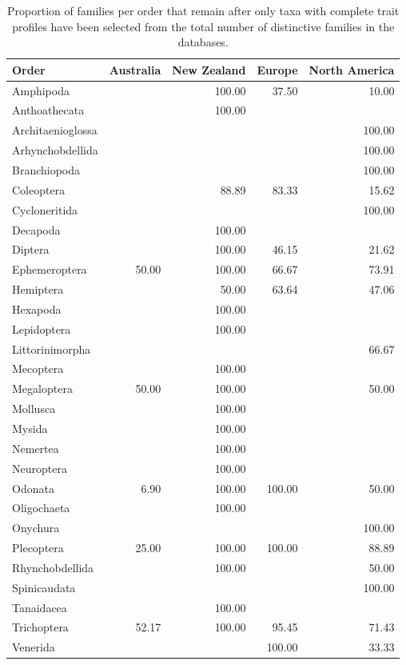 \documentclass{article}
\begin{document}
\begin{table}[H]
  \centering
  \caption{Proportion of families per order that remain
  after only taxa with complete trait profiles have been selected from the total
  number of distinctive families in the databases.} 
  \label{tab:fam_preproc/fam_init}
  \begin{tabular}{lrrrr}
    \hline
  Order & Australia & New Zealand & Europe & North America \\ 
    \hline
  Amphipoda &  & 100.00 & 37.50 & 10.00 \\ 
    Anthoathecata &  & 100.00 &  &  \\ 
    Architaenioglossa &  &  &  & 100.00 \\ 
    Arhynchobdellida &  &  &  & 100.00 \\ 
    Branchiopoda &  &  &  & 100.00 \\ 
    Coleoptera &  & 88.89 & 83.33 & 15.62 \\ 
    Cycloneritida &  &  &  & 100.00 \\ 
    Decapoda &  & 100.00 &  &  \\ 
    Diptera &  & 100.00 & 46.15 & 21.62 \\ 
    Ephemeroptera & 50.00 & 100.00 & 66.67 & 73.91 \\ 
    Hemiptera &  & 50.00 & 63.64 & 47.06 \\ 
    Hexapoda &  & 100.00 &  &  \\ 
    Lepidoptera &  & 100.00 &  &  \\ 
    Littorinimorpha &  &  &  & 66.67 \\ 
    Mecoptera &  & 100.00 &  &  \\ 
    Megaloptera & 50.00 & 100.00 &  & 50.00 \\ 
    Mollusca &  & 100.00 &  &  \\ 
    Mysida &  & 100.00 &  &  \\ 
    Nemertea &  & 100.00 &  &  \\ 
    Neuroptera &  & 100.00 &  &  \\ 
    Odonata & 6.90 & 100.00 & 100.00 & 50.00 \\ 
    Oligochaeta &  & 100.00 &  &  \\ 
    Onychura &  &  &  & 100.00 \\ 
    Plecoptera & 25.00 & 100.00 & 100.00 & 88.89 \\ 
    Rhynchobdellida &  & 100.00 &  & 50.00 \\ 
    Spinicaudata &  &  &  & 100.00 \\ 
    Tanaidacea &  & 100.00 &  &  \\ 
    Trichoptera & 52.17 & 100.00 & 95.45 & 71.43 \\ 
    Venerida &  &  & 100.00 & 33.33 \\ 
     \hline
  \end{tabular}
  \end{table}
\end{document}
